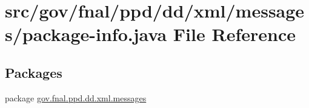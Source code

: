 \hypertarget{gov_2fnal_2ppd_2dd_2xml_2messages_2package-info_8java}{\section{src/gov/fnal/ppd/dd/xml/messages/package-\/info.java File Reference}
\label{gov_2fnal_2ppd_2dd_2xml_2messages_2package-info_8java}
}
\subsection*{Packages}
\begin{DoxyCompactItemize}
\item 
package \hyperlink{namespacegov_1_1fnal_1_1ppd_1_1dd_1_1xml_1_1messages}{gov.\-fnal.\-ppd.\-dd.\-xml.\-messages}
\end{DoxyCompactItemize}
